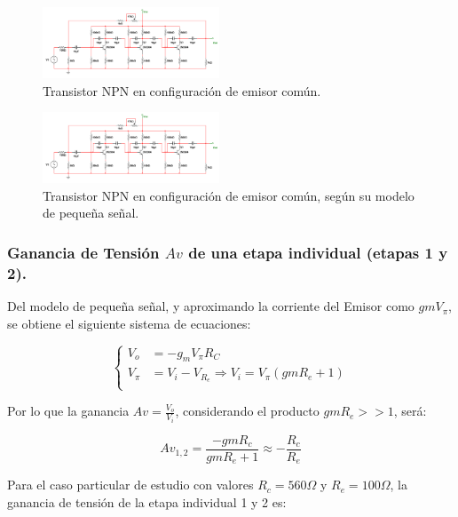 \documentclass[letterpaper, 10 pt, conference]{ieeeconf}  %
\begin{document}
\begin{figure}[H]
  \centering
  \includegraphics[width=0.47\textwidth]{imagenes/diagrama placa.png}
  \caption{Transistor NPN en configuración de emisor común.}
  \label{fig:etapaemisorcomun}
\end{figure}

\begin{figure}[H]
  \centering
  \includegraphics[width=0.47\textwidth]{imagenes/diagrama placa.png}
  \caption{Transistor NPN en configuración de emisor común, según su modelo de pequeña señal.}
  \label{fig:etapaemisorcomunpequeniasenial}
\end{figure}

\subsubsection{Ganancia de Tensión $Av$ de una etapa individual (etapas 1 y 2).}

Del modelo de pequeña señal, y aproximando la corriente del Emisor como $gmV_{\pi}$, se obtiene el siguiente sistema de ecuaciones:

\begin{equation}
\left\{
\begin{aligned}
V_o &= -g_m V_{\pi}R_C \\ 
V_{\pi} &= V_i - V_{R_e} \Longrightarrow V_i = V_{\pi}(gmR_e + 1)\\
\end{aligned}
\right.
\end{equation}

Por lo que la ganancia $Av = \frac{V_o}{V_i}$, considerando el producto $gmR_e >> 1$, será:

\begin{equation}
Av_{1,2} = \frac{-gmR_c}{gmR_e+1} \approx -\frac{R_c}{R_e}
\end{equation}

Para el caso particular de estudio con valores $R_c = 560\Omega$ y $R_e = 100\Omega$, la ganancia de tensión de la etapa individual 1 y 2 es:
\end{document}
